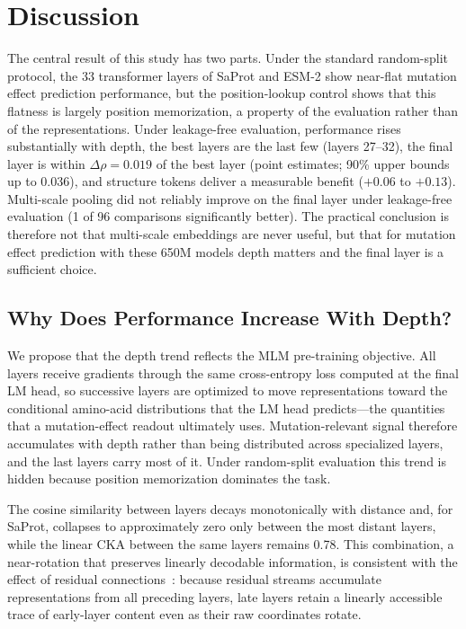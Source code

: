 \documentclass[11pt,a4paper]{article}
\newcommand{\revised}[1]{#1}
\newcommand{\rtwo}[1]{#1}
\newcommand{\rthree}[1]{#1}
\begin{document}
\section{Discussion}

\rtwo{The central result of this study has two parts. Under the standard random-split
protocol, the 33 transformer layers of SaProt and ESM-2 show near-flat mutation effect
prediction performance, but the position-lookup control shows that this flatness is
largely position memorization, a property of the evaluation rather than of the
representations. Under leakage-free evaluation, performance rises substantially with
depth, the best layers are the last few (layers 27--32), the final layer is within
\rthree{$\Delta\rho = 0.019$ of the best layer (point estimates; 90\% upper bounds up to
0.036)}, and structure tokens deliver a measurable benefit (\rthree{$+0.06$ to $+0.13$}).
\rthree{Multi-scale pooling did not reliably improve on the final layer under leakage-free
evaluation (1 of 96 comparisons significantly better).} The practical conclusion is therefore not that multi-scale embeddings are
never useful, but that for mutation effect prediction with these 650M models depth
matters and the final layer is a sufficient choice.}

\subsection{\rtwo{Why Does Performance Increase With Depth?}}

\rtwo{We propose that the depth trend reflects the MLM pre-training objective. All
layers receive gradients through the same cross-entropy loss computed at the final LM
head, so successive layers are optimized to move representations toward the
conditional amino-acid distributions that the LM head predicts---the quantities that
a mutation-effect readout ultimately uses. Mutation-relevant signal therefore
accumulates with depth rather than being distributed across specialized layers, and
the last layers carry most of it. Under random-split evaluation this trend is hidden
because position memorization dominates the task.}

\revised{The cosine similarity between layers decays monotonically with distance and,
for SaProt, collapses to approximately zero only between the most distant layers,
while the linear CKA between the same layers remains \rthree{0.78}. This combination, a
near-rotation that preserves linearly decodable information, is consistent with the
effect of residual connections~\cite{he2016deep}: because residual streams accumulate
representations from all preceding layers, late layers retain a linearly accessible
trace of early-layer content even as their raw coordinates rotate.}
\end{document}
